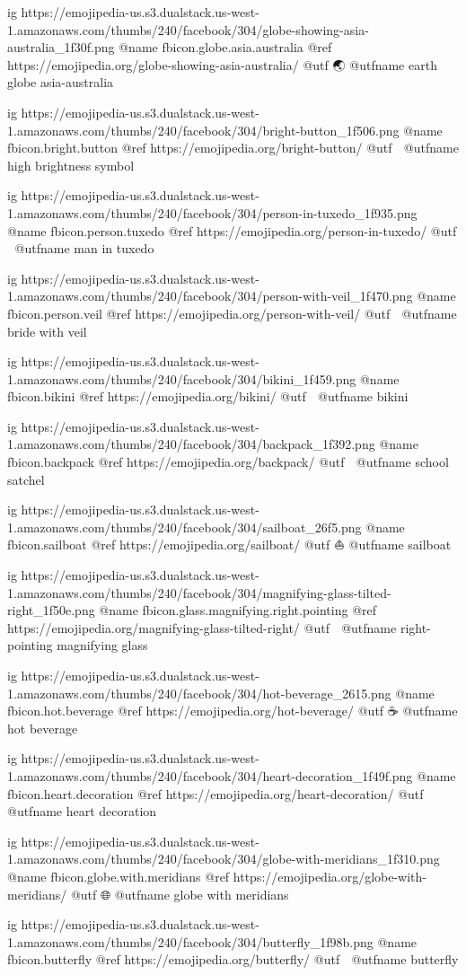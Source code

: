 	ig https://emojipedia-us.s3.dualstack.us-west-1.amazonaws.com/thumbs/240/facebook/304/globe-showing-asia-australia_1f30f.png
	@name fbicon.globe.asia.australia
	@ref https://emojipedia.org/globe-showing-asia-australia/
	@utf 🌏
	@utfname earth globe asia-australia

	ig https://emojipedia-us.s3.dualstack.us-west-1.amazonaws.com/thumbs/240/facebook/304/bright-button_1f506.png
	@name fbicon.bright.button
	@ref https://emojipedia.org/bright-button/
	@utf 🔆
	@utfname high brightness symbol

	ig https://emojipedia-us.s3.dualstack.us-west-1.amazonaws.com/thumbs/240/facebook/304/person-in-tuxedo_1f935.png
	@name fbicon.person.tuxedo
	@ref https://emojipedia.org/person-in-tuxedo/
	@utf 🤵
	@utfname man in tuxedo

	ig https://emojipedia-us.s3.dualstack.us-west-1.amazonaws.com/thumbs/240/facebook/304/person-with-veil_1f470.png
	@name fbicon.person.veil
	@ref https://emojipedia.org/person-with-veil/
	@utf 👰
	@utfname bride with veil

	ig https://emojipedia-us.s3.dualstack.us-west-1.amazonaws.com/thumbs/240/facebook/304/bikini_1f459.png
	@name fbicon.bikini
	@ref https://emojipedia.org/bikini/
	@utf 👙
	@utfname bikini

	ig https://emojipedia-us.s3.dualstack.us-west-1.amazonaws.com/thumbs/240/facebook/304/backpack_1f392.png
	@name fbicon.backpack
	@ref https://emojipedia.org/backpack/
	@utf 🎒
	@utfname school satchel

	ig https://emojipedia-us.s3.dualstack.us-west-1.amazonaws.com/thumbs/240/facebook/304/sailboat_26f5.png
	@name fbicon.sailboat
	@ref https://emojipedia.org/sailboat/
	@utf ⛵
	@utfname sailboat

	ig https://emojipedia-us.s3.dualstack.us-west-1.amazonaws.com/thumbs/240/facebook/304/magnifying-glass-tilted-right_1f50e.png
	@name fbicon.glass.magnifying.right.pointing
	@ref https://emojipedia.org/magnifying-glass-tilted-right/
	@utf 🔎
	@utfname right-pointing magnifying glass

	ig https://emojipedia-us.s3.dualstack.us-west-1.amazonaws.com/thumbs/240/facebook/304/hot-beverage_2615.png
	@name fbicon.hot.beverage
	@ref https://emojipedia.org/hot-beverage/
	@utf ☕
	@utfname hot beverage

	ig https://emojipedia-us.s3.dualstack.us-west-1.amazonaws.com/thumbs/240/facebook/304/heart-decoration_1f49f.png
	@name fbicon.heart.decoration
	@ref https://emojipedia.org/heart-decoration/
	@utf 💟
	@utfname heart decoration

	ig https://emojipedia-us.s3.dualstack.us-west-1.amazonaws.com/thumbs/240/facebook/304/globe-with-meridians_1f310.png
	@name fbicon.globe.with.meridians
	@ref https://emojipedia.org/globe-with-meridians/
	@utf 🌐
	@utfname globe with meridians

	ig https://emojipedia-us.s3.dualstack.us-west-1.amazonaws.com/thumbs/240/facebook/304/butterfly_1f98b.png
	@name fbicon.butterfly
	@ref https://emojipedia.org/butterfly/
	@utf 🦋
	@utfname butterfly

\fi

